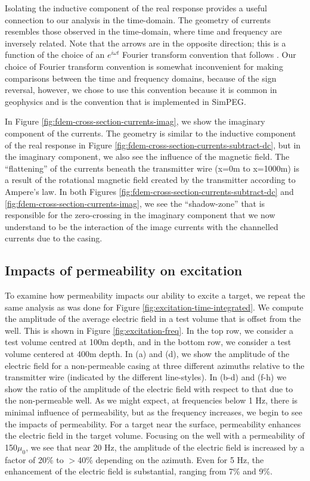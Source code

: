 \documentclass[onecolumn, extra, mreferee]{gji}
\begin{document}
Isolating the inductive component of the real response provides a useful connection to our analysis in the time-domain. The geometry of currents resembles those observed in the time-domain, where time and frequency are inversely related. Note that the arrows are in the opposite direction; this is a function of the choice of an $e^{i\omega t}$ Fourier transform convention that follows \citep{Ward1988}. Our choice of Fourier transform convention is somewhat inconvenient for making comparisons between the time and frequency domains, because of the sign reversal, however, we chose to use this convention because it is common in geophysics and is the convention that is implemented in SimPEG.



In Figure \ref{fig:fdem-cross-section-currents-imag}, we show the imaginary component of the currents. The geometry is similar to the inductive component of the real response in Figure \ref{fig:fdem-cross-section-currents-subtract-dc}, but in the imaginary component, we also see the influence of the magnetic field. The ``flattening'' of the currents beneath the transmitter wire (x=0m to x=1000m) is a result of the rotational magnetic field created by the transmitter according to Ampere's law. In both Figures \ref{fig:fdem-cross-section-currents-subtract-dc} and \ref{fig:fdem-cross-section-currents-imag}, we see the ``shadow-zone'' that is responsible for the zero-crossing in the imaginary component that we now understand to be the interaction of the image currents with the channelled currents due to the casing.



\subsection{Impacts of permeability on excitation}
To examine how permeability impacts our ability to excite a target, we repeat the same analysis as was done for Figure \ref{fig:excitation-time-integrated}. We compute the amplitude of the average electric field in a test volume that is offset from the well. This is shown in Figure \ref{fig:excitation-freq}. In the top row, we consider a test volume centred at 100m depth, and in the bottom row, we consider a test volume centered at 400m depth. In (a) and (d), we show the amplitude of the electric field for a non-permeable casing at three different azimuths relative to the transmitter wire (indicated by the different line-styles). In (b-d) and (f-h) we show the ratio of the amplitude of the electric field with respect to that due to the non-permeable well. As we might expect, at frequencies below 1 Hz, there is minimal influence of permeability, but as the frequency increases, we begin to see the impacts of permeability. For a target near the surface, permeability enhances the electric field in the target volume. Focusing on the well with a permeability of 150$\mu_0$, we see that near 20 Hz, the amplitude of the electric field is increased by a factor of 20\% to $>$40\% depending on the azimuth. Even for 5 Hz, the enhancement of the electric field is substantial, ranging from 7\% and 9\%.
\end{document}
